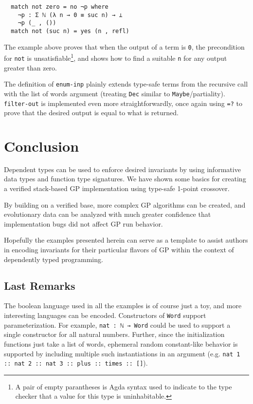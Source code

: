 \documentclass[runningheads,a4paper]{llncs}
\begin{document}
\begin{verbatim}
  match not zero = no ¬p where
    ¬p : Σ ℕ (λ n → 0 ≡ suc n) → ⊥
    ¬p (_ , ())
  match not (suc n) = yes (n , refl)
\end{verbatim}

The example above proves that when the output of a term is \texttt{0},
the precondition for \texttt{not} is unsatisfiable\footnote{A pair of empty
  parantheses is Agda syntax used to indicate to the type
  checker that a value for this type is uninhabitable.}, and shows how
to find a suitable \texttt{n} for any output greater than zero.

The definition of \texttt{enum-inp} plainly extends type-safe terms
from the recursive call with the list of words argument (treating
\texttt{Dec} similar to
\texttt{Maybe}/partiality). \texttt{filter-out} is implemented even
more straightforwardly, once again using \texttt{=?} to prove that the
desired output is equal to what is returned.

\section{Conclusion}

Dependent types can be used to enforce desired invariants by using
informative data types and function type signatures. We have shown
some basics for creating a verified stack-based GP implementation
using type-safe 1-point crossover.

By building on a verified base, more complex GP algorithms can be
created, and evolutionary data can be analyzed with much greater
confidence that implementation bugs did not affect GP run behavior.

Hopefully the examples presented herein can serve as a template to
assist authors in encoding invariants for their particular flavors of
GP within the context of dependently typed programming.

\subsection{Last Remarks}

The boolean language used in all the examples is of course just a toy,
and more interesting languages can be encoded. Constructors of
\texttt{Word} support parameterization. For example, \texttt{nat : ℕ →
  Word} could be used to support a single constructor for all natural
numbers. Further, since the initialization functions just take a list
of words, ephemeral random constant-like behavior is supported by
including multiple such instantiations in an argument
(e.g. \texttt{nat 1 :: nat 2 :: nat 3 :: plus :: times :: []}). 
\end{document}
